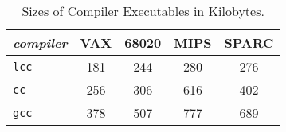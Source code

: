 \begin{table}
\begin{center}
\begin{tabular}{lcccc}
\it compiler	& VAX		& 68020		& MIPS		& SPARC \\ \hline
\tt lcc		& 181		& 244		& 280		& 276 \\ %
\tt cc		& 256		& 306		& 616		& 402 \\
\tt gcc		& 378		& 507		& 777		& 689 \\
\end{tabular}
\end{center}
\caption{Sizes of Compiler Executables in Kilobytes.\label{sizes}}
\end{table}




